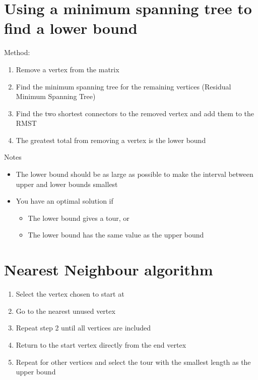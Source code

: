 \documentclass{article}[18pt]
\begin{document}
\section{Using a minimum spanning tree to find a lower bound}
Method:
\begin{enumerate}
\item Remove a vertex from the matrix
\item Find the minimum spanning tree for the remaining vertices (Residual Minimum Spanning Tree)
\item Find the two shortest connectors to the removed vertex and add them to the RMST
\item The greatest total from removing a vertex is the lower bound
\end{enumerate}
Notes
\begin{itemize}
\item The lower bound should be as large as possible to make the interval between upper and lower bounds smallest
\item You have an optimal solution if
\begin{itemize}
\item The lower bound gives a tour, or
\item The lower bound has the same value as the upper bound
\end{itemize}
\end{itemize}
\section{Nearest Neighbour algorithm}
\begin{enumerate}
\item Select the vertex chosen to start at
\item Go to the nearest unused vertex
\item Repeat step 2 until all vertices are included
\item Return to the start vertex directly from the end vertex
\item Repeat for other vertices and select the tour with the smallest length as the upper bound
\end{enumerate}
\newpage
\end{document}
